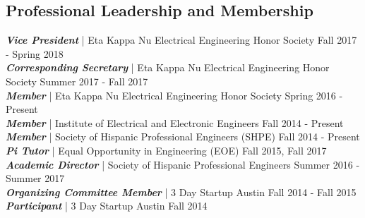 \documentclass[letter]{res}
\begin{document}
\begin{resume}
\section{Professional Leadership and Membership}
{\sl \textbf{Vice President}} | Eta Kappa Nu Electrical Engineering Honor Society \hfill Fall 2017 - Spring 2018\\
{\sl \textbf{Corresponding Secretary}} | Eta Kappa Nu Electrical Engineering Honor Society \hfill Summer 2017 - Fall 2017\\
{\sl \textbf{Member}} | Eta Kappa Nu Electrical Engineering Honor Society \hfill Spring 2016 - Present\\
{\sl \textbf{Member}} | Institute of Electrical and Electronic Engineers \hfill Fall 2014 - Present\\
{\sl \textbf{Member}} | Society of Hispanic Professional Engineers (SHPE) \hfill Fall 2014 - Present\\
{\sl \textbf{Pi Tutor}} | Equal Opportunity in Engineering (EOE) \hfill Fall 2015, Fall 2017\\
{\sl \textbf{Academic Director}} | Society of Hispanic Professional Engineers \hfill Summer 2016 - Summer 2017\\
{\sl \textbf{Organizing Committee Member}} | 3 Day Startup Austin \hfill Fall 2014 - Fall 2015\\
{\sl \textbf{Participant}} | 3 Day Startup Austin \hfill Fall 2014\\

\vspace{-6mm}


\end{resume}
\end{document}
